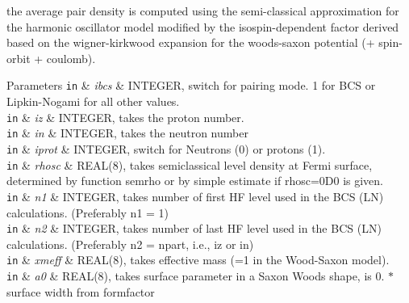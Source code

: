 \begin{DoxyEnumerate}
\item the average pair density is computed using the semi-\/classical approximation for the harmonic oscillator model modified by the isospin-\/dependent factor derived based on the wigner-\/kirkwood expansion for the woods-\/saxon potential (+ spin-\/orbit + coulomb).


\begin{DoxyParams}[1]{Parameters}
\mbox{\tt in}  & {\em ibcs} & I\+N\+T\+E\+G\+ER, switch for pairing mode. 1 for B\+CS or Lipkin-\/\+Nogami for all other values. \\
\hline
\mbox{\tt in}  & {\em iz} & I\+N\+T\+E\+G\+ER, takes the proton number. \\
\hline
\mbox{\tt in}  & {\em in} & I\+N\+T\+E\+G\+ER, takes the neutron number \\
\hline
\mbox{\tt in}  & {\em iprot} & I\+N\+T\+E\+G\+ER, switch for Neutrons (0) or protons (1). \\
\hline
\mbox{\tt in}  & {\em rhosc} & R\+E\+A\+L(8), takes semiclassical level density at Fermi surface, determined by function \textquotesingle{}semrho\textquotesingle{} or by simple estimate if \textquotesingle{}rhosc=0\+D0\textquotesingle{} is given. \\
\hline
\mbox{\tt in}  & {\em n1} & I\+N\+T\+E\+G\+ER, takes number of first HF level used in the B\+CS (LN) calculations. (Preferably {\ttfamily n1} = 1) \\
\hline
\mbox{\tt in}  & {\em n2} & I\+N\+T\+E\+G\+ER, takes number of last HF level used in the B\+CS (LN) calculations. (Preferably {\ttfamily n2} = {\ttfamily npart}, i.\+e., {\ttfamily iz} or {\ttfamily in}) \\
\hline
\mbox{\tt in}  & {\em xmeff} & R\+E\+A\+L(8), takes effective mass (=1 in the Wood-\/\+Saxon model). \\
\hline
\mbox{\tt in}  & {\em a0} & R\+E\+A\+L(8), takes surface parameter in a Saxon Woods shape, is 0. $\ast$ surface width from formfactor \\
\hline
\end{DoxyParams}

\end{DoxyEnumerate}
